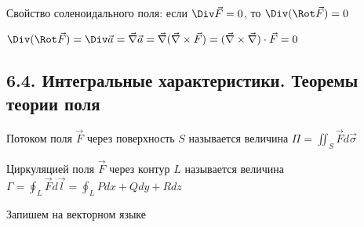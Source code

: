 \documentclass[12pt]{article}
\begin{document}
    \begin{MyTheorem}
         Свойство соленоидального поля: если $\Div \vec{F} = 0$, то $\Div (\Rot \vec{F}) = 0$
    \end{MyTheorem}

    \begin{MyProof}
        $\Div (\Rot \vec{F}) = \Div \vec{a} = \vec\nabla \vec{a} = \vec\nabla (\vec\nabla \times \vec{F}) = (\vec\nabla \times \vec\nabla) \cdot \vec{F} = 0$
    \end{MyProof}

    \hypertarget{integralcharacteristics}{}

    \subsection{6.4. Интегральные характеристики. Теоремы теории поля}

    \Mems Потоком поля $\vec{F}$ через поверхность $S$ называется величина $\Pi = \iint_S \vec{F}d\vec{\sigma}$

    \Defs Циркуляцией поля $\vec{F}$ через контур $L$ называется величина $\Gamma = \oint_L \vec F d\vec l = \oint_L Pdx + Qdy + Rdz$

    \Nota Запишем \Ths на векторном языке

    \hypertarget{theoremGaussOstrogradskyyinvectorform}{}
\end{document}
